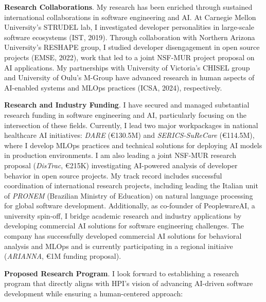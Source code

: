 \textbf{Research Collaborations}.
My research has been enriched through sustained international collaborations in software engineering and AI.
At Carnegie Mellon University's STRUDEL lab, I investigated developer personalities in large-scale software ecosystems (IST, 2019). 
Through collaboration with Northern Arizona University's RESHAPE group, I studied developer disengagement in open source projects (EMSE, 2022), work that led to a joint NSF-MUR project proposal on AI applications.
My partnerships with University of Victoria's CHISEL group and University of Oulu's M-Group have advanced research in human aspects of AI-enabled systems and MLOps practices (ICSA, 2024), respectively.

\textbf{Research and Industry Funding}.
I have secured and managed substantial research funding in software engineering and AI, particularly focusing on the intersection of these fields. Currently, I lead two major workpackages in national healthcare AI initiatives: \textit{DARE} (€130.5M) and \textit{SERICS-SuReCare} (€114.5M), where I develop MLOps practices and technical solutions for deploying AI models in production environments. I am also leading a joint NSF-MUR research proposal (\textit{DisTrac}, €215K) investigating AI-powered analysis of developer behavior in open source projects.
My track record includes successful coordination of international research projects, including leading the Italian unit of \textit{PRONEM} (Brazilian Ministry of Education) on natural language processing for global software development. 
Additionally, as co-founder of PeoplewareAI, a university spin-off, I bridge academic research and industry applications by developing commercial AI solutions for software engineering challenges. The company has successfully developed commercial AI solutions for behavioral analysis and MLOps and is currently participating in a regional initiaive (\textit{ARIANNA}, €1M funding proposal). 

\textbf{Proposed Research Program}. 
I look forward to establishing a research program that directly aligns with HPI's vision of advancing AI-driven software development while ensuring a human-centered approach:

